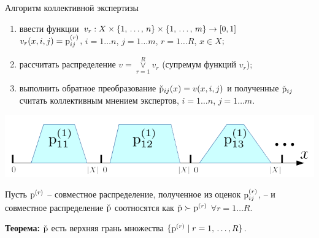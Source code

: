 \begin{frame}{Алгоритм коллективной экспертизы}
 \begin{center}
      \vspace{-1ex}
	
	\vspace{-2mm}
	\begin{enumerate}
		\item ввести функции $v_r: X \times \{1,\, \ldots,\, n\} \times \{1,\, \ldots,\, m\} \rightarrow [0,1]$ 
		\\ $v_r(x, i, j) = {\mathrm{p}}_{ij}^{(r)}$, { \footnotesize $i = 1 \ldots n$, $j = 1 \ldots m$, $r = 1 \ldots R$, $x \in X$};
		\item рассчитать распределение $v = \underset{r=1}{\overset{R} \vee}  v_r$ (супремум функций $v_r$); 
		\item выполнить обратное преобразование $\check{{\mathrm{p}}}_{ij}(x) = v(x, i,j)$ и полученные $\check{{\mathrm{p}}}_{ij}$  считать коллективным мнением экспертов, {\footnotesize $i = 1 \ldots n$, $j = 1 \ldots m$}.
	\end{enumerate}
	\vspace{-2mm}
	\includegraphics[width=0.85\linewidth]{./pic/glueon}
	\vspace{-1mm}
	 
	 Пусть ${\mathrm{p}}^{(r)}$ -- совместное распределение, полученное из оценок ${\mathrm{p}}_{ij}^{(r)}$, -- и совместное распределение $\check{{\mathrm{p}}}$ соотносятся как $\check{{\mathrm{p}}} \succ {\mathrm{p}}^{(r)}$  $\forall r = 1 \ldots R$. 
	 
	\textbf{Теорема:}  $\check{{\mathrm{p}}}$ есть верхняя грань множества $\{{\mathrm{p}}^{(r)} \mid r=1,\, \ldots, R\}$.
 \end{center}
\end{frame} %


